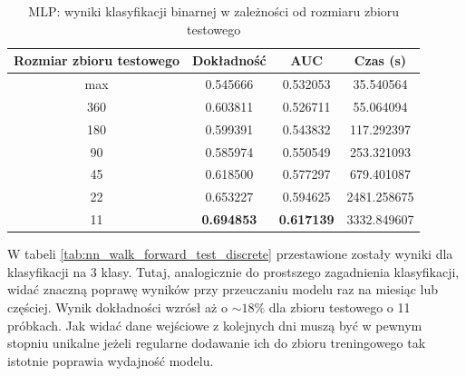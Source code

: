 \documentclass[a4paper, twoside, 11pt, openright]{article}
\begin{document}
\begin{table}[H]
    \centering
    \begin{tabular}{|c|c|c|c|}
    \hline
        \textbf{Rozmiar zbioru testowego} & \textbf{Dokładność} &  \textbf{AUC} &  \textbf{Czas (s)} \\ \hline 
max                           &  0.545666 &  0.532053 &   35.540564 \\  \hline
360                         &  0.603811 &  0.526711 &    55.064094 \\  \hline
180                         &  0.599391 &  0.543832 &   117.292397 \\  \hline
90                         &  0.585974 &  0.550549 &   253.321093 \\  \hline
45                         &  0.618500 &  0.577297 &   679.401087 \\  \hline
22                          &  0.653227 &  0.594625 &  2481.258675 \\  \hline
11                          &  \textbf{0.694853} &  \textbf{0.617139} &  3332.849607 \\ \hline
    \end{tabular}
    \caption{MLP: wyniki klasyfikacji binarnej w zależności od rozmiaru zbioru testowego}
    \label{tab:nn_walk_forward_test_binary}
\end{table}

W tabeli \ref{tab:nn_walk_forward_test_discrete} przestawione zostały wyniki dla klasyfikacji na 3 klasy. Tutaj, analogicznie do prostszego zagadnienia klasyfikacji, widać znaczną poprawę wyników przy przeuczaniu modelu raz na miesiąc lub częściej. Wynik dokładności wzrósł aż o $\sim 18\%$ dla zbioru testowego o 11 próbkach. Jak widać dane wejściowe z kolejnych dni muszą być w pewnym stopniu unikalne jeżeli regularne dodawanie ich do zbioru treningowego tak istotnie poprawia wydajność modelu.
\end{document}
